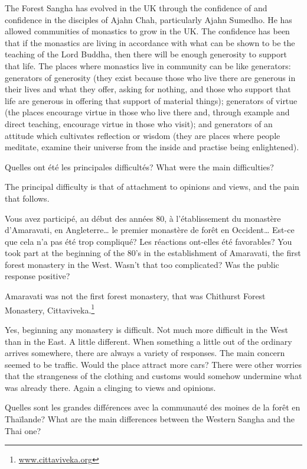 \answer{}
The Forest Sangha has evolved in the UK through the confidence of and
confidence in the disciples of Ajahn Chah, particularly Ajahn Sumedho. 
He has allowed communities of monastics to grow in the UK. The
confidence has been that if the monastics are living in accordance with
what can be shown to be the teaching of the Lord Buddha, then there will
be enough generosity to support that life. The places where monastics
live in community can be like generators: generators of generosity (they
exist because those who live there are generous in their lives and what
they offer, asking for nothing, and those who support that life are generous
in offering that support of material things); generators of virtue (the
places encourage virtue in those who live there and, through example and
direct teaching, encourage virtue in those who visit); and generators of
an attitude which cultivates reflection or wisdom (they are places where
people meditate, examine their universe from the inside and practise
being enlightened). 

\questionBi%
{Quelles ont été les principales difficultés?}%
{What were the main difficulties?}

\answer{}
The principal difficulty is that of attachment to opinions and views,
and the pain that follows.

\questionBi%
{Vous avez participé, au début des années 80, à l'établissement du monastère d'Amaravati, en Angleterre\ldots{} le premier monastère de forêt en Occident\ldots{} Est-ce que cela n'a pas été trop compliqué? Les réactions ont-elles été favorables?}
{You took part at the beginning of the 80's in the establishment of Amaravati, the first forest monastery in the West. Wasn't that too complicated? Was the public response positive?}

\answer{}
Amaravati was not the first forest monastery, that was Chithurst
Forest Monastery, Cittaviveka.\footnote{\href{http://cittaviveka.org}{www.cittaviveka.org}}

Yes, beginning any monastery is difficult. Not much more difficult in
the West than in the East. A little different. When something a little
out of the ordinary arrives somewhere, there are always a variety of
responses. The main concern seemed to be traffic. Would the place
attract more cars? There were other worries that the strangeness of the
clothing and customs would somehow undermine what was already there. 
Again a clinging to views and opinions. 

\questionBi%
{Quelles sont les grandes différences avec la communauté des moines de la forêt en Thaïlande?}%
{What are the main differences between the Western Sangha and the Thai one?}

